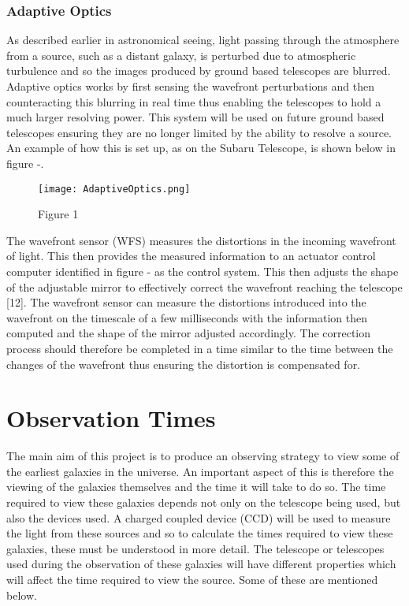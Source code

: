 \documentclass[pdf,color]{UoBnote}
\begin{document}
\subsubsection{Adaptive Optics}
As described earlier in astronomical seeing, light passing through the atmosphere from a source, such as a distant galaxy, is perturbed due to atmospheric turbulence and so the images produced by ground based telescopes are blurred. Adaptive optics works by first sensing the wavefront perturbations and then counteracting this blurring in real time thus enabling the telescopes to hold a much larger resolving power. This system will be used on future ground based telescopes ensuring they are no longer limited by the ability to resolve a source. An example of how this is set up, as on the Subaru Telescope, is shown below in figure -. \\
\newline
\newline
\begin{figure}[H]
\begin{center}
\texttt{[image: AdaptiveOptics.png]}
\end{center}
\caption{Figure 1}\label{fig:figure1}
\end{figure}
\noindent
The wavefront sensor (WFS) measures the distortions in the incoming wavefront of light. This then provides the measured information to an actuator control computer identified in figure - as the control system. This then adjusts the shape of the adjustable mirror to effectively correct the wavefront reaching the telescope [12].  The wavefront sensor can measure the distortions introduced into the wavefront on the timescale of a few milliseconds with the information then computed and the shape of the mirror adjusted accordingly. The correction process should therefore be completed in a time similar to the time between the changes of the wavefront thus ensuring the distortion is compensated for.


\section{Observation Times}

The main aim of this project is to produce an observing strategy to view some of the earliest galaxies in the universe. An important aspect of this is therefore the viewing of the galaxies themselves and the time it will take to do so. The time required to view these galaxies depends not only on the telescope being used, but also the devices used. A charged coupled device (CCD) will be used to measure the light from these sources and so to calculate the times required to view these galaxies, these must be understood in more detail. The telescope or telescopes used during the observation of these galaxies will have different properties which will affect the time required to view the source. Some of these are mentioned below.
\end{document}

